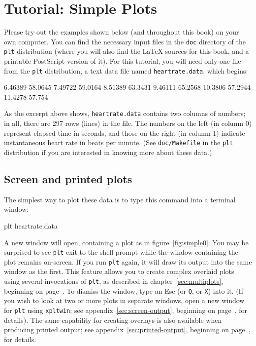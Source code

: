 \documentclass{book}
\begin{document}
\section{Tutorial: Simple Plots \label{sec:simple-plots}}

Please try out the examples shown below (and throughout this book) on
your own computer.   You can find the necessary input files in the
{\tt doc} directory of the {\tt plt} distribution (where you will also
find the \LaTeX{} sources for this book, and a printable PostScript
version of it).  For this tutorial, you will need only one file from
the {\tt plt} distribution, a text data file named {\tt heartrate.data},
which begins:

\begin{center}
\begin{boxedverbatim}
6.46389 58.0645
7.49722 59.0164
8.51389 63.3431
9.46111 65.2568
10.3806 57.2944
11.4278 57.754
\end{boxedverbatim}
\end{center}

%
As the excerpt above shows, {\tt heartrate.data} contains two columns
of numbers;  in all, there are 297 rows (lines) in the file.  The
numbers on the left (in column 0) represent elapsed time in seconds, and
those on the right (in column 1) indicate instantaneous heart rate in
beats per minute.  (See {\tt doc/Makefile} in the {\tt plt}
distribution if you are interested in knowing more about these data.)

\subsection{Screen and printed plots}

The simplest way to plot these data is to type this command into a
terminal window:

\begin{center}
\begin{boxedverbatim}
plt heartrate.data
\end{boxedverbatim}
\end{center}

%
%
A new window will open, containing a plot as in
figure~\ref{fig:simple0}.  You may be surprised to see {\tt plt} exit
to the shell prompt while the window containing the plot remains
on-screen.  If you run {\tt plt} again, it will draw its output into
the same window as the first.  This feature allows you to create
complex overlaid plots using several invocations of {\tt plt}, as
described in chapter~\ref{sec:multiplots}, beginning on
page~\pageref{sec:multiplots}.  To dismiss the window, type an {\sf
Esc} (or {\tt Q}, or {\tt X}) into it.  (If you wish to look at two or
more plots in separate windows, open a new window for {\tt plt} using
{\tt xpltwin}; see appendix~\ref{sec:screen-output}, beginning on
page~\pageref{sec:screen-output}, for details). The same capability
for creating overlays is also available when producing printed output;
see appendix~\ref{sec:printed-output}, beginning on
page~\pageref{sec:printed-output}, for details.
\end{document}
